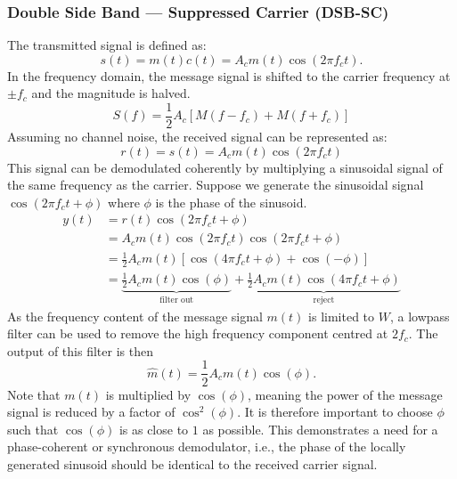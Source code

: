 \documentclass{article}
\begin{document}
\subsubsection{Double Side Band --- Suppressed Carrier (DSB-SC)}
The transmitted signal is defined as:
\begin{equation*}
    s\left( t \right) = m\left( t \right) c\left( t \right) = A_c m\left( t \right) \cos{\left( 2 \pi f_c t \right)}.
\end{equation*}
In the frequency domain, the message signal is shifted to the carrier frequency at \(\pm f_c\) and the magnitude is halved.
\begin{equation*}
    S\left( f \right) = \frac{1}{2} A_c \left[ M\left( f - f_c \right) + M\left( f + f_c \right) \right]
\end{equation*}
Assuming no channel noise, the received signal can be represented as:
\begin{equation*}
    r\left( t \right) = s\left( t \right) = A_c m\left( t \right) \cos{\left( 2 \pi f_c t \right)}
\end{equation*}
This signal can be demodulated coherently by multiplying a sinusoidal signal of the same frequency as the carrier.
Suppose we generate the sinusoidal signal \(\cos{\left( 2 \pi f_c t + \phi \right)}\) where \(\phi\) is the phase of the sinusoid.
\begin{align*}
    y\left( t \right) & = r\left( t \right) \cos{\left( 2 \pi f_c t + \phi \right)}                                                                                                                                             \\
                      & = A_c m\left( t \right) \cos{\left( 2 \pi f_c t \right)} \cos{\left( 2 \pi f_c t + \phi \right)}                                                                                                        \\
                      & = \frac{1}{2} A_c m\left( t \right) \left[ \cos{\left( 4 \pi f_c t + \phi \right)} + \cos{\left( -\phi \right)} \right]                                                                                 \\
                      & = \underbrace{\frac{1}{2} A_c m\left( t \right) \cos{\left( \phi \right)}}_{\text{filter out}} + \underbrace{\frac{1}{2} A_c m\left( t \right) \cos{\left( 4 \pi f_c t + \phi \right)}}_{\text{reject}}
\end{align*}
As the frequency content of the message signal \(m\left( t \right)\) is limited to \(W\), a lowpass filter can be used to remove the high frequency component centred at \(2f_c\).
The output of this filter is then
\begin{equation*}
    \hat{m}\left( t \right) = \frac{1}{2} A_c m\left( t \right) \cos{\left( \phi \right)}.
\end{equation*}
Note that \(m\left( t \right)\) is multiplied by \(\cos{\left( \phi \right)}\), meaning the power of the message signal is reduced by a factor of \(\cos^2{\left( \phi \right)}\).
It is therefore important to choose \(\phi\) such that \(\cos{\left( \phi \right)}\) is as close to \(1\) as possible.
This demonstrates a need for a phase-coherent or synchronous demodulator, i.e., the phase of the locally generated sinusoid should
be identical to the received carrier signal.
\end{document}
